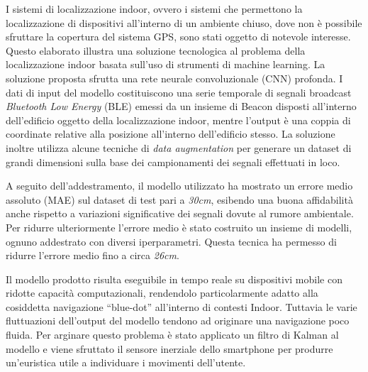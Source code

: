 \documentclass{standalone}
\begin{document}
I sistemi di localizzazione indoor, ovvero i sistemi che permettono la
localizzazione di dispositivi all’interno di un ambiente chiuso, dove non è
possibile sfruttare la copertura del sistema GPS, sono stati oggetto di
notevole interesse. Questo elaborato illustra una soluzione tecnologica al
problema della localizzazione indoor basata sull’uso di strumenti di machine
learning. La soluzione proposta sfrutta una rete neurale convoluzionale (CNN)
profonda. I dati di input del modello costituiscono una serie temporale di
segnali broadcast \emph{Bluetooth Low Energy} (BLE) emessi da un insieme di
Beacon disposti all’interno dell’edificio oggetto della localizzazione indoor,
mentre l’output è una coppia di coordinate relative alla posizione all’interno
dell’edificio stesso. La soluzione inoltre utilizza alcune tecniche di
\emph{data augmentation} per generare un dataset di grandi dimensioni sulla
base dei campionamenti dei segnali effettuati in loco.

A seguito dell’addestramento, il modello utilizzato ha mostrato un errore medio
assoluto (MAE) sul dataset di test pari a \emph{30cm}, esibendo una buona
affidabilità anche rispetto a variazioni significative dei segnali dovute al
rumore ambientale. Per ridurre ulteriormente l’errore medio  è stato costruito
un insieme di modelli, ognuno addestrato con diversi iperparametri. Questa
tecnica ha permesso di ridurre l’errore medio fino a circa \emph{26cm}.

Il modello prodotto risulta eseguibile in tempo reale su dispositivi mobile con
ridotte capacità computazionali, rendendolo particolarmente adatto alla
cosiddetta navigazione ``blue-dot'' all’interno di contesti Indoor. Tuttavia le
varie fluttuazioni dell’output del modello tendono ad originare una navigazione
poco fluida.  Per arginare questo problema è stato applicato un filtro di
Kalman al modello e viene sfruttato il sensore inerziale dello smartphone per
produrre un’euristica utile a individuare i movimenti dell’utente.
\end{document}
